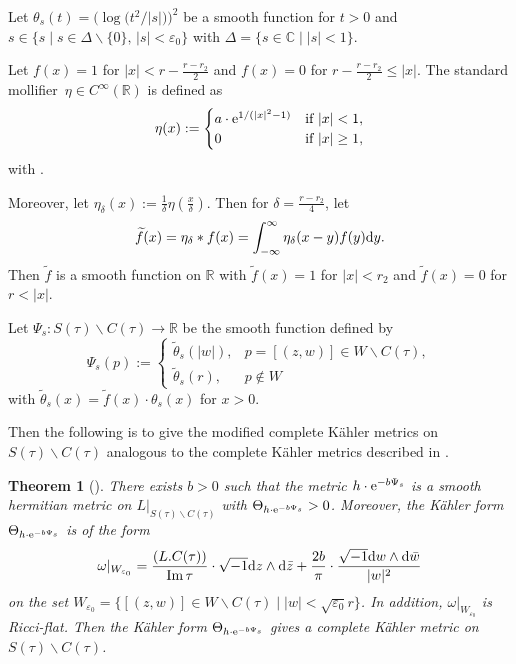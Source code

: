 \documentclass[pdftex]{sigma}
\numberwithin{equation}{section}
\newtheorem{Theorem}{Theorem}[section]
\begin{document}
Let $\theta_s(t)=\bigl(\log\bigl(t^2/|s|\bigr)\bigr)^2$ be a smooth function for $t>0$ and $s \in \{ s\mid s \in \Delta \backslash \{ 0 \},\, |s|<\varepsilon_0 \}$ with $\Delta = \{ s \in \mathbb{C} \mid |s|<1 \}$.

Let $f(x)=1$ for $|x|<r-\frac{r-r_2}{2}$ and $f(x)=0$ for $r-\frac{r-r_2}{2} \leq|x|$. The standard mollifier~${\eta \in C^\infty(\mathbb{R})}$ is defined as
\[\eta(x):=\begin{cases}
a\cdot {\rm e}^{1/(|x|^2-1)} & \text{if}\  |x|<1, \\
0 & \text{if}\  |x| \geq 1,
\end{cases}\]
with  \cite{Lawrence}.

Moreover, let $\eta_\delta(x):=\frac{1}{\delta}\eta(\frac{x}{\delta})$. Then for $\delta=\frac{r-r_2}{4}$, let
\[\widetilde{f}(x)=\eta_\delta * f(x)=\int^\infty_{-\infty}\eta_\delta(x-y)f(y){\rm d}y.\]
Then $\widetilde{f}$ is a smooth function on $\mathbb{R}$ with $\widetilde{f}(x)=1$ for $|x|<r_2$ and $\widetilde{f}(x)=0$ for $r<|x|$.

Let $\Psi_s\colon S(\tau) \backslash C(\tau) \rightarrow \mathbb{R}$ be the smooth function defined by
\[\Psi_s(p):= \begin{cases}
\widetilde{\theta}_s(|w|), & p=[(z,w)] \in W\backslash C(\tau), \\
\widetilde{\theta}_s(r), & p \notin W
\end{cases}\]
with $\widetilde{\theta}_s(x)=\widetilde{f}(x) \cdot \theta_s(x)$ for $x>0$.

Then the following is to give the modified complete K\"ahler metrics on $S(\tau)\backslash C(\tau)$ analogous to the complete K\"ahler metrics described in \cite{Takayuki-Takato2}.

\begin{Theorem}[{\cite{Takayuki-Takato2}}] \label{Theorem3.19}
 There exists $b>0$ such that the metric $h \cdot {\rm e}^{-b \Psi_s}$ is a smooth hermitian metric on $L|_{S(\tau)\backslash C(\tau)}$ with $\Theta_{h \cdot {\rm e}^{-b \Psi_s}}>0$. Moreover, the K\"ahler form $\Theta_{h \cdot {\rm e}^{-b \Psi_s}}$ is of the form
\[\omega|_{W_{\varepsilon_0}}=\frac{ (L.C(\tau))}{\operatorname{ Im}\tau}\cdot \sqrt{-1} {\rm d}z \wedge {\rm d} \bar{z}+\frac{2b}{\pi} \cdot \frac{\sqrt{-1}{\rm d}w \wedge {\rm d} \bar{w}}{|w|^2}\]
on the set $W_{\varepsilon_0}=\{ [(z,w)]\in W \backslash C(\tau)\mid |w|<\sqrt{\varepsilon_0}r \}$. In addition, $\omega|_{W_{\varepsilon_0}}$ is Ricci-flat. Then the K\"ahler form $\Theta_{h\cdot {\rm e}^{-b\Psi_s}}$ gives a complete K\"ahler metric on $S(\tau)\backslash C(\tau)$.
\end{Theorem}
\end{document}
